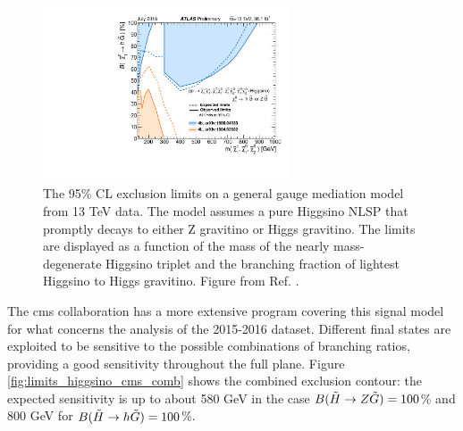 \begin{figure}[htbp]
	\centering
	\includegraphics[width=0.65\textwidth]{figures/summary_plots/ATLAS_SUSY_EWSummary_GGM.pdf}
	\caption{The 95\% CL exclusion limits on a general gauge mediation model from 13 TeV data. 
	The model assumes a pure Higgsino NLSP that promptly decays to either Z gravitino or Higgs gravitino. 
	The limits are displayed as a function of the mass of the nearly mass-degenerate Higgsino triplet and the branching fraction of lightest Higgsino to Higgs gravitino. 	Figure from Ref. \cite{atlasSUSYSummary}.
	} 
	\label{fig:summary_atlas_higgsino_GMSB}
\end{figure}

The \gls{cms} collaboration has a more extensive program covering this signal model for what concerns the analysis of the 
2015-2016 dataset. 
Different final states are exploited to be sensitive to the possible combinations of branching ratios, 
providing a good sensitivity throughout the full plane.
Figure \ref{fig:limits_higgsino_cms_comb} shows the combined exclusion contour: the expected sensitivity is up to about 580 GeV in the case $B(\tilde{H}\rightarrow Z \tilde{G})=100$\% and 800 GeV for 
$B(\tilde{H}\rightarrow h \tilde{G})=100$\%.

